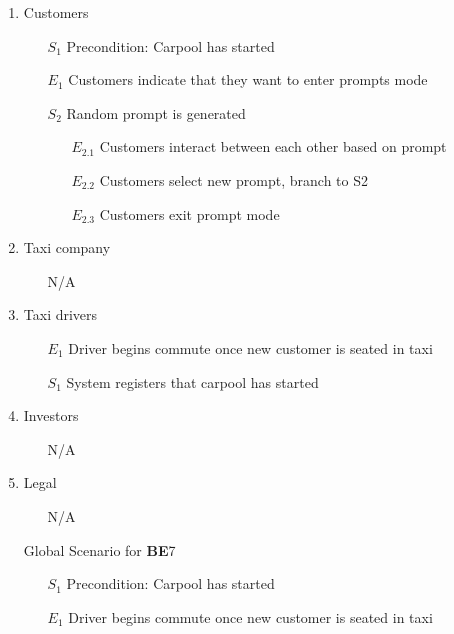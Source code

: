 \documentclass[]{article}
\begin{document}
\begin{enumerate}[{\textbf{BE}}1.]
\begin{enumerate}[{\textbf{VP7}}.1]
        \item Customers
            \begin{enumerate}
                \item[$S_1$] Precondition: Carpool has started
                \item[$E_1$] Customers indicate that they want to enter prompts mode
                \item[$S_2$] Random prompt is generated
                \begin{enumerate}
                    \item[$E_{2.1}$] Customers interact between each other based on prompt
                    \item[$E_{2.2}$] Customers select new prompt, branch to S2
                    \item[$E_{2.3}$] Customers exit prompt mode
                \end{enumerate}
            \end{enumerate}
        \item Taxi company
            \begin{enumerate}
                \item[N/A]
            \end{enumerate}
        \item Taxi drivers
            \begin{enumerate}
                \item[$E_1$] Driver begins commute once new customer is seated in taxi
                \item[$S_1$] System registers that carpool has started
            \end{enumerate}
        \item Investors
            \begin{enumerate}
                \item[N/A]
            \end{enumerate}
        \item Legal
            \begin{enumerate}
                \item[N/A]
            \end{enumerate}
        \item[Global] Scenario for \textbf{BE}7
            \begin{enumerate}
                \item[$S_1$] Precondition: Carpool has started
                \item[$E_1$] Driver begins commute once new customer is seated in taxi

\end{enumerate}
\end{enumerate}
\end{enumerate}
\end{document}

